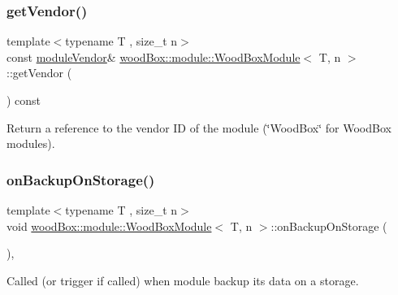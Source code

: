 \subsubsection{\texorpdfstring{get\+Vendor()}{getVendor()}}
{\footnotesize\ttfamily template$<$typename T , size\+\_\+t n$>$ \\
const \mbox{\hyperlink{classwood_box_1_1module_1_1_wood_box_module_adf5d59bae2980ff138284d0fa885df19}{module\+Vendor}}\& \mbox{\hyperlink{classwood_box_1_1module_1_1_wood_box_module}{wood\+Box\+::module\+::\+Wood\+Box\+Module}}$<$ T, n $>$\+::get\+Vendor (\begin{DoxyParamCaption}{ }\end{DoxyParamCaption}) const\hspace{0.3cm}{\ttfamily [inline]}}

Return a reference to the vendor ID of the module (\char`\"{}\+Wood\+Box\char`\"{} for Wood\+Box modules). \mbox{\label{classwood_box_1_1module_1_1_wood_box_module_a28c9b89bc3429d6e78fa38698c78d553}} 
\subsubsection{\texorpdfstring{on\+Backup\+On\+Storage()}{onBackupOnStorage()}}
{\footnotesize\ttfamily template$<$typename T , size\+\_\+t n$>$ \\
void \mbox{\hyperlink{classwood_box_1_1module_1_1_wood_box_module}{wood\+Box\+::module\+::\+Wood\+Box\+Module}}$<$ T, n $>$\+::on\+Backup\+On\+Storage (\begin{DoxyParamCaption}{ }\end{DoxyParamCaption})\hspace{0.3cm}{\ttfamily [inline]}, {\ttfamily [protected]}}

Called (or trigger if called) when module backup its data on a storage. \mbox{\label{classwood_box_1_1module_1_1_wood_box_module_acacb4ac748c70bd1f172d9a87e07dfbf}} 
